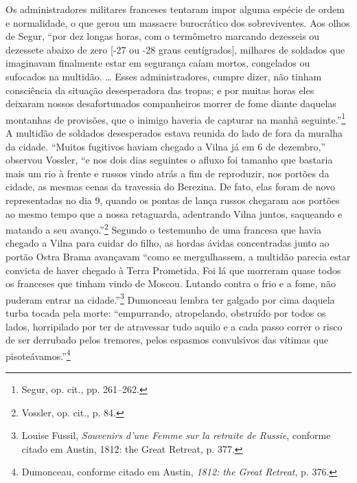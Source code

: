 Os administradores militares franceses tentaram impor alguma espécie de
ordem e normalidade, o que gerou um massacre burocrático dos
sobreviventes. Aos olhos de Segur, ``por dez longas horas, com o
termômetro marcando dezesseis ou dezessete abaixo de zero {[}-27 ou -28
graus centígrados{]}, milhares de soldados que imaginavam finalmente
estar em segurança caíam mortos, congelados ou sufocados na multidão.
\ldots{} Esses administradores, cumpre dizer, não tinham consciência da
situação desesperadora das tropas; e por muitas horas eles deixaram
nossos desafortunados companheiros morrer de fome diante daquelas
montanhas de provisões, que o inimigo haveria de capturar na manhã
seguinte.''\footnote{Segur, op. cit., pp. 261--262.} A multidão de
soldados desesperados estava reunida do lado de fora da muralha da
cidade. ``Muitos fugitivos haviam chegado a Vilna já em 6 de dezembro,''
observou Vossler, ``e nos dois dias seguintes o afluxo foi tamanho que
bastaria mais um rio à frente e russos vindo atrás a fim de reproduzir,
nos portões da cidade, as mesmas cenas da travessia do Berezina. De
fato, elas foram de novo representadas no dia 9, quando os pontas de
lança russos chegaram aos portões ao mesmo tempo que a nossa retaguarda,
adentrando Vilna juntos, saqueando e matando a seu avanço.''\footnote{Vossler,
  op. cit., p. 84.} Segundo o testemunho de uma francesa que havia
chegado a Vilna para cuidar do filho, as hordas ávidas concentradas
junto ao portão Ostra Brama avançavam ``como se mergulhassem, a multidão
parecia estar convicta de haver chegado à Terra Prometida. Foi lá que
morreram quase todos os franceses que tinham vindo de Moscou. Lutando
contra o frio e a fome, não puderam entrar na cidade.''\footnote{Louise
  Fussil, \emph{Souvenirs d'une Femme sur la retraite de Russie},
  conforme citado em Austin, 1812: the Great Retreat, p. 377.} Dumonceau
lembra ter galgado por cima daquela turba tocada pela morte:
``empurrando, atropelando, obstruído por todos os lados, horripilado por
ter de atravessar tudo aquilo e a cada passo correr o risco de ser
derrubado pelos tremores, pelos espasmos convulsivos das vítimas que
pisoteávamos.''\footnote{Dumonceau, conforme citado em Austin,
  \emph{1812: the Great Retreat}, p. 376.}

